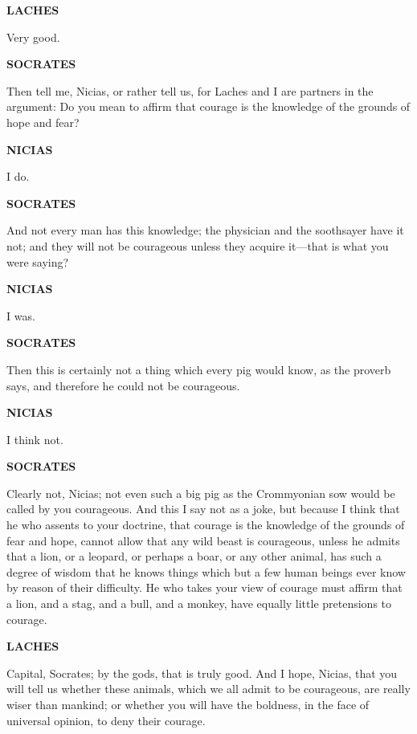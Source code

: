 \documentclass[11pt,letter]{article}
\begin{document}
\par \textbf{LACHES}
\par   Very good.

\par \textbf{SOCRATES}
\par   Then tell me, Nicias, or rather tell us, for Laches and I are partners in the argument:  Do you mean to affirm that courage is the knowledge of the grounds of hope and fear?

\par \textbf{NICIAS}
\par   I do.

\par \textbf{SOCRATES}
\par   And not every man has this knowledge; the physician and the soothsayer have it not; and they will not be courageous unless they acquire it—that is what you were saying?

\par \textbf{NICIAS}
\par   I was.

\par \textbf{SOCRATES}
\par   Then this is certainly not a thing which every pig would know, as the proverb says, and therefore he could not be courageous.

\par \textbf{NICIAS}
\par   I think not.

\par \textbf{SOCRATES}
\par   Clearly not, Nicias; not even such a big pig as the Crommyonian sow would be called by you courageous. And this I say not as a joke, but because I think that he who assents to your doctrine, that courage is the knowledge of the grounds of fear and hope, cannot allow that any wild beast is courageous, unless he admits that a lion, or a leopard, or perhaps a boar, or any other animal, has such a degree of wisdom that he knows things which but a few human beings ever know by reason of their difficulty. He who takes your view of courage must affirm that a lion, and a stag, and a bull, and a monkey, have equally little pretensions to courage.

\par \textbf{LACHES}
\par   Capital, Socrates; by the gods, that is truly good. And I hope, Nicias, that you will tell us whether these animals, which we all admit to be courageous, are really wiser than mankind; or whether you will have the boldness, in the face of universal opinion, to deny their courage.
\end{document}
